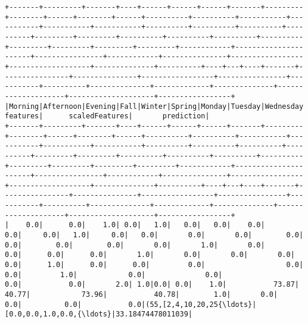 \documentclass[11pt]{article}
\begin{document}
    \begin{Verbatim}[commandchars=\\\{\}]
+-------+---------+-------+----+------+------+------+-------+---------+--------+------+--------+------+----------+----------+-----------+-----------+-----------+-----------+----------+----------+----------+----------+---------+---------+----------+----------+----------+----------+---------+---------+---------+---------+------------+----------------------+----------------+------------+---------------+-----------------+-------------------+--------------+----------+----+---+----+-------+----------------+---------------+-----------------+----------------+-----------+----------+--------------+-------------+--------------+--------------------+--------------------+-----------------+
|Morning|Afternoon|Evening|Fall|Winter|Spring|Monday|Tuesday|Wednesday|Thursday|Friday|Saturday|Sunday|dropoff\_cc|dropoff\_GM|dropoff\_ues|dropoff\_Gvs|dropoff\_Uws|dropoff\_Les|dropoff\_Lm|dropoff\_Wq|dropoff\_Nb|dropoff\_ch|Pickup\_cc|Pickup\_GM|Pickup\_ues|Pickup\_Gvs|Pickup\_Uws|Pickup\_Les|Pickup\_Lm|Pickup\_Wq|Pickup\_Nb|Pickup\_Nq|VendorID\_1\_0|store\_and\_fwd\_flag\_1\_0|RateCode\_stdrate|RateCode\_JFK|RateCode\_Newark|RateCode\_Nassau\_W|RateCode\_Negotiated|RateCode\_Group|avg\_temp\_C|Rain|Fog|Snow|Holiday|pickup\_longitude|pickup\_latitude|dropoff\_longitude|dropoff\_latitude|ptype\_CCard|ptype\_cash|ptype\_nocharge|ptype\_dispute|ptype\_voidtrip|            features|      scaledFeatures|       prediction|
+-------+---------+-------+----+------+------+------+-------+---------+--------+------+--------+------+----------+----------+-----------+-----------+-----------+-----------+----------+----------+----------+----------+---------+---------+----------+----------+----------+----------+---------+---------+---------+---------+------------+----------------------+----------------+------------+---------------+-----------------+-------------------+--------------+----------+----+---+----+-------+----------------+---------------+-----------------+----------------+-----------+----------+--------------+-------------+--------------+--------------------+--------------------+-----------------+
|    0.0|      0.0|    1.0| 0.0|   1.0|   0.0|   0.0|    0.0|      0.0|     0.0|   1.0|     0.0|   0.0|       0.0|       0.0|        0.0|        0.0|        0.0|        0.0|       0.0|       1.0|       0.0|       0.0|      0.0|      0.0|       1.0|       0.0|       0.0|       0.0|      0.0|      1.0|      0.0|      0.0|         0.0|                   0.0|             0.0|         1.0|            0.0|              0.0|                0.0|           0.0|       2.0| 1.0|0.0| 0.0|    1.0|           73.87|          40.77|            73.96|           40.78|        1.0|       0.0|           0.0|          0.0|           0.0|(55,[2,4,10,20,25{\ldots}|[0.0,0.0,1.0,0.0,{\ldots}|33.18474478011039|

\end{Verbatim}
\end{document}
